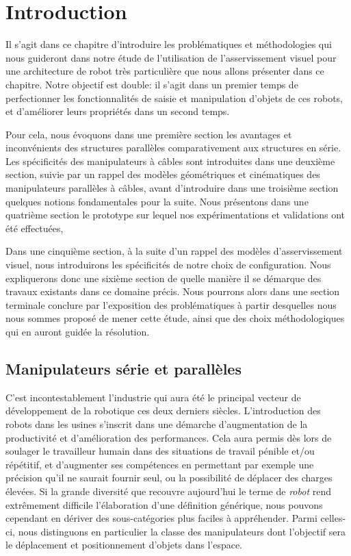 \section{Introduction}

Il s'agit dans ce chapitre d'introduire les problématiques et méthodologies qui nous guideront dans notre étude de l'utilisation de l'asservissement visuel pour une architecture de robot très particulière que nous allons présenter dans ce chapitre. Notre objectif est double: il s'agit dans un premier temps de perfectionner les fonctionnalités de saisie et manipulation d'objets de ces robots, et d'améliorer leurs propriétés dans un second temps.

Pour cela, nous  évoquons dans une première section les avantages et inconvénients des structures parallèles comparativement aux structures en série. Les spécificités des manipulateurs à c\^ables sont introduites dans une deuxième section, suivie par un rappel des modèles géométriques et cinématiques des manipulateurs parallèles à c\^ables, avant d'introduire dans une troisième section quelques notions fondamentales pour la suite. Nous présentons dans une quatrième section le prototype sur lequel nos expérimentations et validations ont été effectuées,

Dans une cinquième section, à la suite d'un rappel des modèles d'asservissement visuel, nous introduirons les spécificités de notre choix de configuration. Nous expliquerons donc une sixième section de quelle manière il se démarque des travaux existants dans ce domaine précis. Nous pourrons alors dans une section terminale conclure par l'exposition des problématiques à partir desquelles nous nous sommes proposé de mener cette étude, ainsi que des choix méthodologiques qui en auront guidée la résolution.

\subsection{Manipulateurs série et parallèles}

C'est incontestablement l'industrie qui aura été le principal vecteur de développe\-ment de la robotique ces deux derniers siècles. L'introduction des robots dans les usines s'inscrit dans une démarche d'augmentation de la productivité et d'amélio\-ration des performances. Cela aura permis dès lors de soulager le travailleur humain dans des situations de travail pénible et/ou répétitif, et d'augmenter ses compétences en permettant par exemple une précision qu'il ne saurait fournir seul, ou la possibilité de déplacer des charges élevées. Si la grande diversité que recouvre aujourd'hui le terme de {\it robot} rend extrêmement difficile l'élaboration d'une définition générique, nous pouvons cependant en dériver des sous-catégories plus faciles à appréhender. Parmi celles-ci, nous distinguons en particulier la classe des manipulateurs dont l'objectif sera le déplacement et positionnement d'objets dans l'espace.

